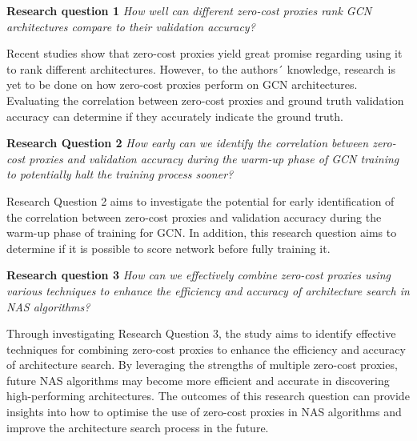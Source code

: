 \textbf{Research question 1} \textit{How well can different zero-cost proxies rank \gls{GCN} architectures compare to their validation accuracy?}

Recent studies \autocite{abdelfattah2021zero, colin2022adeeperlook} show that zero-cost proxies yield great promise regarding using it to rank different architectures. However, to the authors´ knowledge, research is yet to be done on how zero-cost proxies perform on \gls{GCN} architectures. Evaluating the correlation between zero-cost proxies and ground truth validation accuracy can determine if they accurately indicate the ground truth.


\textbf{Research Question 2} \textit{How early can we identify the correlation between zero-cost proxies and validation accuracy during the warm-up phase of \gls{GCN} training to potentially halt the training process sooner?}


Research Question 2 aims to investigate the potential for early identification of the correlation between zero-cost proxies and validation accuracy during the warm-up phase of training for \gls{GCN}. In addition, this research question aims to determine if it is possible to score network before fully training it. 


\textbf{Research question 3} \textit{How can we effectively combine zero-cost proxies using various techniques to enhance the efficiency and accuracy of architecture search in \gls{NAS} algorithms?}

Through investigating Research Question 3, the study aims to identify effective techniques for combining zero-cost proxies to enhance the efficiency and accuracy of architecture search. By leveraging the strengths of multiple zero-cost proxies, future \gls{NAS} algorithms may become more efficient and accurate in discovering high-performing architectures. The outcomes of this research question can provide insights into how to optimise the use of zero-cost proxies in \gls{NAS} algorithms and improve the architecture search process in the future.